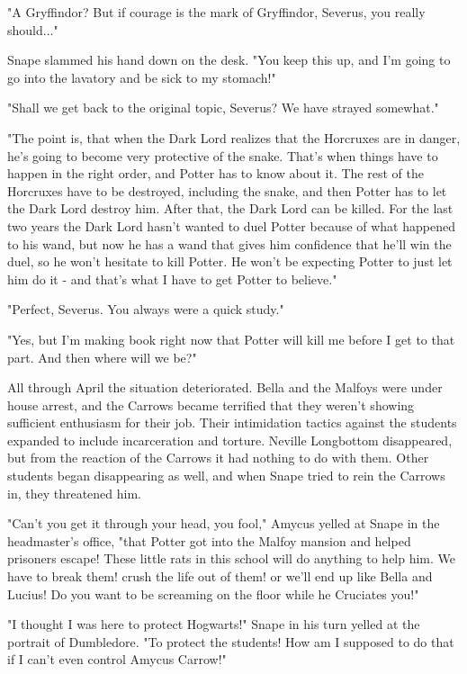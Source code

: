 \documentclass[a4paper,11pt]{article}
\begin{document}
"A Gryffindor? But if courage is the mark of Gryffindor, Severus, you really should..."

Snape slammed his hand down on the desk. "You keep this up, and I'm going to go into the lavatory and be sick to my stomach!"

"Shall we get back to the original topic, Severus? We have strayed somewhat."

"The point is, that when the Dark Lord realizes that the Horcruxes are in danger, he's going to become very protective of the snake. That's when things have to happen in the right order, and Potter has to know about it. The rest of the Horcruxes have to be destroyed, including the snake, and then Potter has to let the Dark Lord destroy him. After that, the Dark Lord can be killed. For the last two years the Dark Lord hasn't wanted to duel Potter because of what happened to his wand, but now he has a wand that gives him confidence that he'll win the duel, so he won't hesitate to kill Potter. He won't be expecting Potter to just let him do it - and that's what I have to get Potter to believe."

"Perfect, Severus. You always were a quick study."

"Yes, but I'm making book right now that Potter will kill me before I get to that part. And then where will we be?"

All through April the situation deteriorated. Bella and the Malfoys were under house arrest, and the Carrows became terrified that they weren't showing sufficient enthusiasm for their job. Their intimidation tactics against the students expanded to include incarceration and torture. Neville Longbottom disappeared, but from the reaction of the Carrows it had nothing to do with them. Other students began disappearing as well, and when Snape tried to rein the Carrows in, they threatened him.

"Can't you get it through your head, you fool," Amycus yelled at Snape in the headmaster's office, "that Potter got into the Malfoy mansion and helped prisoners escape! These little rats in this school will do anything to help him. We have to break them! crush the life out of them! or we'll end up like Bella and Lucius! Do you want to be screaming on the floor while he Cruciates you!"

"I thought I was here to protect Hogwarts!" Snape in his turn yelled at the portrait of Dumbledore. "To protect the students! How am I supposed to do that if I can't even control Amycus Carrow!"
\end{document}
